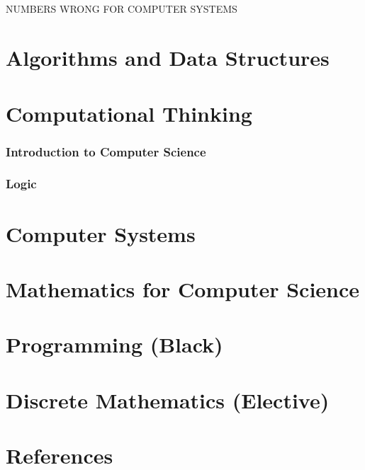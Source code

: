 \documentclass{article}
\title{\thetitle\\[0.5em]\large{\thesubtitle}}
\author{\theauthor}
\date{\thedate}
\newcommand{\colour}[2] {\color{#1}#2\color{black}}
\begin{document}
\maketitle\thispagestyle{empty} %
\setcounter{tocdepth}{2}
\newpage\tableofcontents %

\clearpage\setcounter{page}{1}\newpage %
\pagestyle{fancy}

\noindent\colour{red}{NUMBERS WRONG FOR COMPUTER SYSTEMS}





\part{Algorithms and Data Structures}


\newpage\part{Computational Thinking}

\section{Introduction to Computer Science}

\section{Logic}

\newpage\part{Computer Systems}


\newpage\part{Mathematics for Computer Science}

\newpage\part{Programming (Black)}

\newpage\part{Discrete Mathematics (Elective)}

\newpage\part{References}

\end{document}
